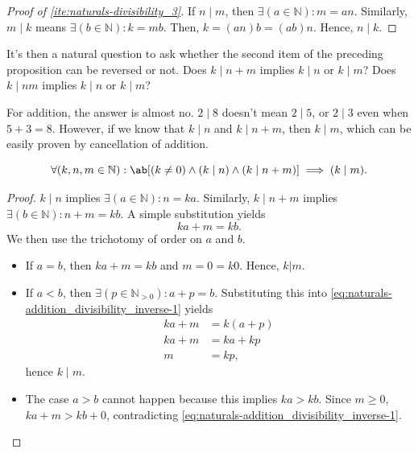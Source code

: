 \begin{proof}[Proof of \cref{ite:naturals-divisibility_3}]
  If \(n \mid m\), then \(\exists (a \in \mathbb{N}) : m = a n\). Similarly, \(m \mid k\) means
  \(\exists (b \in \mathbb{N}) : k = m b\). Then, \(k = (a n) b = (ab) n\). Hence, \(n \mid k\).
\end{proof}

It's then a natural question to ask whether the second item of the preceding proposition can be
reversed or not. Does \(k \mid n + m\) implies \(k \mid n\) or \(k \mid m\)? Does \(k \mid nm\)
implies \(k \mid n\) or \(k \mid m\)?

For addition, the answer is almost no. \(2 \mid 8\) doesn't mean \(2 \mid 5\), or \(2 \mid 3\) even
when \(5 + 3 = 8\). However, if we know that \(k \mid n\) and \(k \mid n + m\), then \(k \mid m\),
which can be easily proven by cancellation of addition.

\begin{cor}{}{}
  \begin{equation}
    \forall (k, n, m \in \mathbb{N}) : \ab[(k \neq 0) \land (k \mid n) \land (k \mid n + m)] \implies (k \mid m). \nonumber
  \end{equation}
\end{cor}

\begin{proof}
  \(k \mid n\) implies \(\exists (a \in \mathbb{N}) : n = k a\). Similarly, \(k \mid n + m\) implies
  \(\exists (b \in \mathbb{N}) : n + m = k b\). A simple substitution yields
  \begin{equation}
    k a + m = k b. \label{eq:naturals-addition_divisibility_inverse-1}
  \end{equation}
  We then use the trichotomy of order on \(a\) and \(b\).

  \begin{itemize}
    \item If \(a = b\), then \(k a + m = k b\) and \(m = 0 = k 0\). Hence, \(k | m\).
    \item If \(a < b\), then \(\exists (p \in \mathbb{N}_{>0}) : a + p = b\). Substituting this into
          \cref{eq:naturals-addition_divisibility_inverse-1} yields
          \begin{align}
            k a + m & = k (a + p) \\
            k a + m & = k a + k p \\
            m       & = k p,
          \end{align}
          hence \(k \mid m\).
    \item The case \(a > b\) cannot happen because this implies \(k a > k b\). Since \(m \geq 0\),
          \(k a + m > k b + 0\), contradicting \cref{eq:naturals-addition_divisibility_inverse-1}.
  \end{itemize}
\end{proof}

